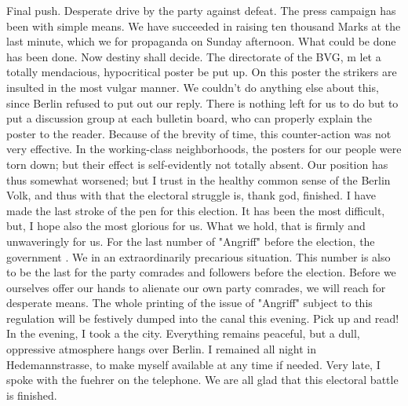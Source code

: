 
Final push. Desperate drive by the party against defeat. The press campaign has been  with simple means. We have succeeded in raising ten thousand Marks at the last minute, which we  for propaganda on Sunday afternoon. What could be done has been done. Now destiny shall decide. The directorate of the BVG, m let a totally mendacious, hypocritical poster be put up. On this poster the strikers are insulted in the most vulgar manner. We couldn't do anything else about this, since Berlin  refused to put out our reply. There is nothing left for us to do but to put a discussion group at each bulletin board, who can properly explain the poster to the reader. Because of the brevity of time, this counter-action was not very effective. In the working-class neighborhoods, the posters for our people were torn down; but their effect is self-evidently not totally absent. Our position has thus somewhat worsened; but I trust in the healthy common sense of the Berlin Volk, and thus with that the electoral struggle is, thank god, finished. I have made the last stroke of the pen for this election. It has been the most difficult, but, I hope also the most glorious for us. What we hold, that is firmly and unwaveringly for us. For the last number of "Angriff" before the election, the government . We  in an extraordinarily precarious situation. This number is also to be the last  for the party comrades and followers before the election. Before we ourselves offer our hands to alienate our own party comrades, we will reach for desperate means. The whole printing of the issue of "Angriff" subject to this regulation will be festively dumped into the canal this evening. Pick up and read! In the evening, I took a   the city. Everything remains peaceful, but a dull, oppressive atmosphere hangs over Berlin. I remained all night in Hedemannstrasse, to make myself available at any time if needed. Very late, I spoke with the fuehrer on the telephone. We are all glad that this electoral battle is finished.

